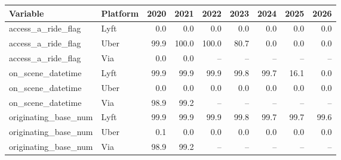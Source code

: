 \begin{tabular}{llrrrrrrr}
\toprule
Variable & Platform & 2020 & 2021 & 2022 & 2023 & 2024 & 2025 & 2026 \\
\midrule
access\_a\_ride\_flag & Lyft & 0.0 & 0.0 & 0.0 & 0.0 & 0.0 & 0.0 & 0.0 \\
access\_a\_ride\_flag & Uber & 99.9 & 100.0 & 100.0 & 80.7 & 0.0 & 0.0 & 0.0 \\
access\_a\_ride\_flag & Via & 0.0 & 0.0 & -- & -- & -- & -- & -- \\
on\_scene\_datetime & Lyft & 99.9 & 99.9 & 99.9 & 99.8 & 99.7 & 16.1 & 0.0 \\
on\_scene\_datetime & Uber & 0.0 & 0.0 & 0.0 & 0.0 & 0.0 & 0.0 & 0.0 \\
on\_scene\_datetime & Via & 98.9 & 99.2 & -- & -- & -- & -- & -- \\
originating\_base\_num & Lyft & 99.9 & 99.9 & 99.9 & 99.8 & 99.7 & 99.7 & 99.6 \\
originating\_base\_num & Uber & 0.1 & 0.0 & 0.0 & 0.0 & 0.0 & 0.0 & 0.0 \\
originating\_base\_num & Via & 98.9 & 99.2 & -- & -- & -- & -- & -- \\
\bottomrule
\end{tabular}
